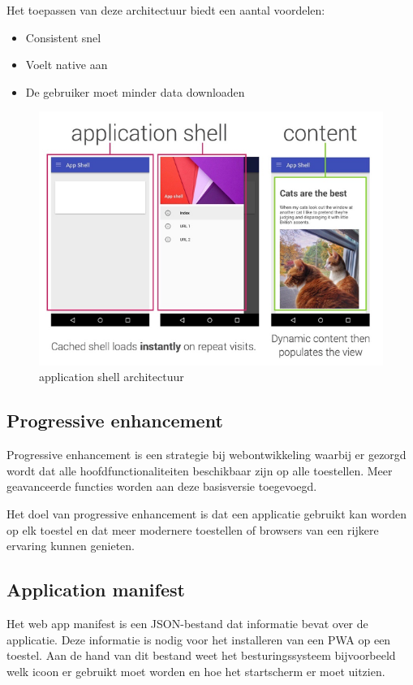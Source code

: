 	Het toepassen van deze architectuur biedt een aantal voordelen:
	
	\begin{itemize}
		\item	Consistent snel
		\item	Voelt native aan
		\item	De gebruiker moet minder data downloaden
	\end{itemize}
	\autocite{Osmani2019a}
	
	\begin{figure}[!htb]
		\centering
		\includegraphics{./img/ApplicationShell.png}
		\caption{application shell architectuur \autocite{Osmani2015}}
		\label{fig:AppShell}
	\end{figure}
	
\newpage
\subsection{Progressive enhancement}
	Progressive enhancement is een strategie bij webontwikkeling waarbij er gezorgd wordt dat alle hoofdfunctionaliteiten beschikbaar zijn op alle toestellen. Meer geavanceerde functies worden aan deze basisversie toegevoegd. 
	
	Het doel van progressive enhancement is dat een applicatie gebruikt kan worden op elk toestel en dat meer modernere toestellen of browsers van een rijkere ervaring kunnen genieten.
	\autocite{Vanhala2017}
	
	
\subsection{Application manifest}
	Het web app manifest is een JSON-bestand dat informatie bevat over de applicatie. Deze informatie is nodig voor het installeren van een PWA op een toestel.
	Aan de hand van dit bestand weet het besturingssysteem bijvoorbeeld welk icoon er gebruikt moet worden en hoe het startscherm er moet uitzien.
	
